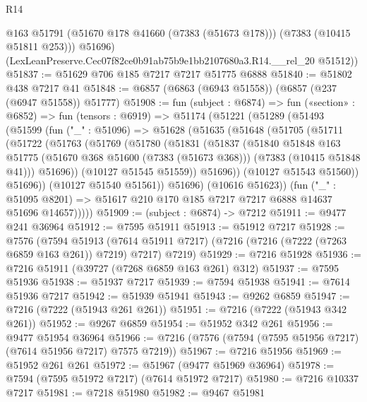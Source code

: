 \begin{lexlean}{R14}
\begin{coremodule}
          @163
          @51791
          (@51670 @178 @41660 (@7383 (@51673 @178)))
          (@7383 (@10415 @51811 @253)))
        @51696)
      (LexLeanPreserve.Cec07f82ce0b91ab75b9e1bb2107680a3.R14.__rel_20 @51512))
@51837 := @51629 @706 @185 @7217 @7217 @51775 @6888
@51840 := @51802 @438 @7217 @41
@51848 := @6857 (@6863 (@6943 @51558)) (@6857 (@237 (@6947 @51558)) @51777)
@51908 := fun (subject : @6874) =>
  fun («section» : @6852) =>
  fun (tensors : @6919) =>
  @51174
    (@51221
      (@51289
        (@51493
          (@51599
            (fun ("_" : @51096) =>
            @51628
              (@51635
                (@51648
                  (@51705
                    (@51711
                      (@51722
                        (@51763
                          (@51769
                            (@51780
                              (@51831
                                (@51837
                                  (@51840
                                    @51848
                                    @163
                                    @51775
                                    (@51670 @368 @51600 (@7383 (@51673 @368)))
                                    (@7383 (@10415 @51848 @41)))
                                  @51696))
                              (@10127 @51545 @51559))
                            @51696))
                        (@10127 @51543 @51560))
                      @51696))
                  (@10127 @51540 @51561))
                @51696)
              (@10616 @51623))
            (fun ("_" : @51095 @8201) =>
            @51617 @210 @170 @185 @7217 @7217 @6888 @14637 @51696 @14657)))))
@51909 := (subject : @6874) -> @7212
@51911 := @9477 @241 @36964
@51912 := @7595 @51911
@51913 := @51912 @7217
@51928 := @7576
    (@7594
      @51913
      (@7614 @51911 @7217)
      (@7216 (@7216 (@7222 (@7263 @6859 @163 @261)) @7219) @7217)
      @7219)
@51929 := @7216 @51928
@51936 := @7216 @51911 (@39727 (@7268 @6859 @163 @261) @312)
@51937 := @7595 @51936
@51938 := @51937 @7217
@51939 := @7594 @51938
@51941 := @7614 @51936 @7217
@51942 := @51939 @51941
@51943 := @9262 @6859
@51947 := @7216 (@7222 (@51943 @261 @261))
@51951 := @7216 (@7222 (@51943 @342 @261))
@51952 := @9267 @6859
@51954 := @51952 @342 @261
@51956 := @9477 @51954 @36964
@51966 := @7216 (@7576 (@7594 (@7595 @51956 @7217) (@7614 @51956 @7217) @7575 @7219))
@51967 := @7216 @51956
@51969 := @51952 @261 @261
@51972 := @51967 (@9477 @51969 @36964)
@51978 := @7594 (@7595 @51972 @7217) (@7614 @51972 @7217)
@51980 := @7216 @10337 @7217
@51981 := @7218 @51980
@51982 := @9467 @51981

\end{coremodule}
\end{lexlean}
